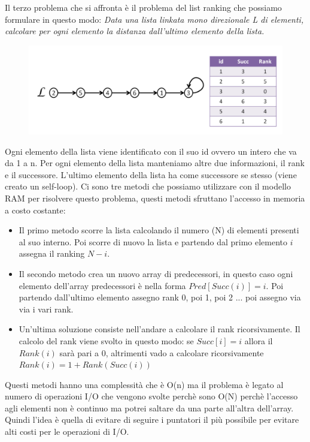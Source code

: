 \documentclass[14pt]{extreport}
\begin{document}
Il terzo problema che si affronta è il problema del list ranking che possiamo formulare in questo modo:
\newline
\textit{Data una lista linkata mono direzionale L di elementi, calcolare per ogni elemento la distanza dall'ultimo elemento della lista.}
\newline

\begin{figure}[h!]
  \centering
  \includegraphics[width=\linewidth]{LinkedList.png}
 
\end{figure}

Ogni elemento della lista viene identificato con il suo id ovvero un intero che va da 1 a n. Per ogni elemento della lista manteniamo altre due informazioni, il rank e il successore.
L'ultimo elemento della lista ha come successore se stesso (viene creato un self-loop).
Ci sono tre metodi che possiamo utilizzare con il modello RAM per risolvere questo problema, questi metodi sfruttano l'accesso in memoria a costo costante:
\begin{itemize}
    \item Il primo metodo scorre la lista calcolando il numero (N) di elementi presenti al suo interno. Poi scorre di nuovo la lista e partendo dal primo elemento $i$ assegna il ranking $N-i$.
    \item Il secondo metodo crea un nuovo array di predecessori, in questo caso ogni elemento dell'array predecessori è nella forma $Pred[Succ(i)] = i$. Poi partendo dall'ultimo elemento assegno rank 0, poi 1, poi 2 ... poi assegno via via i vari rank.
    \item Un'ultima soluzione consiste nell'andare a calcolare il rank ricorsivamente. Il calcolo del rank viene svolto in questo modo: se $Succ[i] = i$ allora il $Rank(i)$ sarà pari a 0, altrimenti vado a calcolare ricorsivamente $Rank(i) = 1 + Rank(Succ(i))$
\end{itemize}

Questi metodi hanno una complessità che è O(n) ma il problema è legato al numero di operazioni I/O che vengono svolte perchè sono O(N) perchè l'accesso agli elementi non è continuo ma potrei saltare da una parte all'altra dell'array.
Quindi l'idea è quella di evitare di seguire i puntatori il più possibile per evitare alti costi per le operazioni di I/O.
\end{document}
